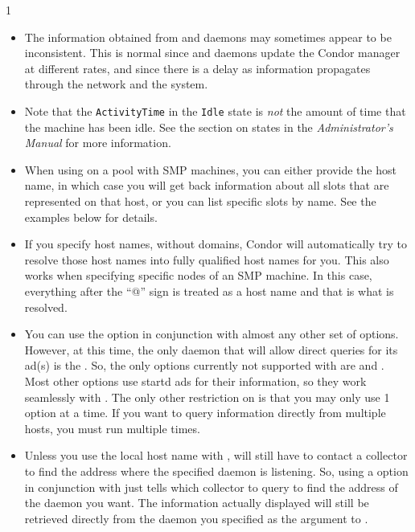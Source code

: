\begin{ManPage}{\label{man-condor-status}}{1}
\begin{itemize}
	\item The information obtained from  and 
	daemons
	may sometimes appear to be inconsistent.  This is normal since
	  and  daemons update the Condor
	manager at different rates, and since there is a
	delay as information propagates through the network and the system.

	\item Note that the \texttt{ActivityTime} in the \texttt{Idle} state is
	\emph{not} the amount of time that the machine has been idle.  See the
	section on  states in the \emph{Administrator's Manual}
	for more information.

	\item When using  on a pool with SMP machines,
	you can either provide the host name, in which case you will
	get back information about all slots that are represented on
	that host, or you can list specific slots by name.
	See the examples below for details.

	\item If you specify host names, without domains, Condor will
	automatically try to resolve those host names into fully
	qualified host names for you.
	This also works when specifying specific nodes of an SMP
	machine.
	In this case, everything after the ``@'' sign is treated as a
	host name and that is what is resolved.

	\item You can use the  option in conjunction with
	almost any other set of options.
	However, at this time, the only daemon that will allow direct
	queries for its ad(s) is the .
	So, the only options currently not supported with
	 are  and .
	Most other options use startd ads for their information, so
	they work seamlessly with .
	The only other restriction on  is that you may
	only use 1  option at a time.
	If you want to query information directly from multiple hosts,
	you must run  multiple times.

	\item Unless you use the local host name with ,
	 will still have to contact a collector to find
	the address where the specified daemon is listening.
	So, using a  option in conjunction with
	 just tells  which collector to
	query to find the address of the daemon you want.
	The information actually displayed will still be retrieved
	directly from the daemon you specified as the argument to
	.


\end{itemize}
\end{ManPage}
